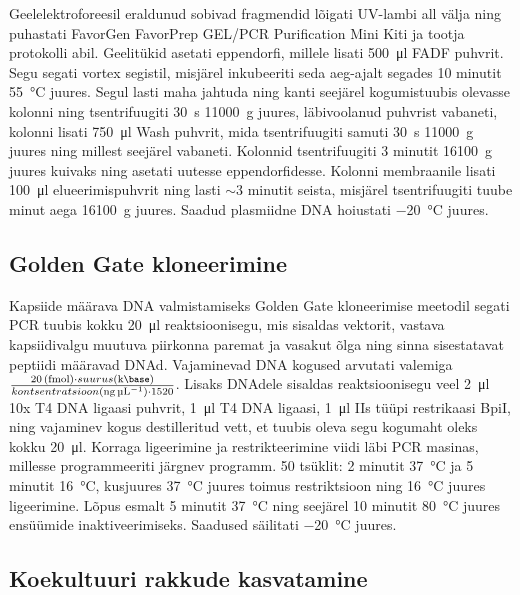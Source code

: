 \documentclass{trkut}%
\begin{document}
Geelelektroforeesil eraldunud sobivad fragmendid lõigati UV-lambi all välja ning puhastati FavorGen FavorPrep GEL/PCR Purification Mini Kiti ja tootja protokolli abil. Geelitükid asetati eppendorfi, millele lisati \SI{500}{\micro\litre} FADF puhvrit. Segu segati vortex segistil, misjärel inkubeeriti seda aeg-ajalt segades 10 minutit \SI{55}{\celsius} juures. Segul lasti maha jahtuda ning kanti seejärel kogumistuubis olevasse kolonni ning tsentrifuugiti \SI{30}{\second} \SI{11000}{\g} juures, läbivoolanud puhvrist vabaneti, kolonni lisati \SI{750}{\micro\litre} Wash puhvrit, mida tsentrifuugiti samuti \SI{30}{\second} \SI{11000}{\g} juures ning millest seejärel vabaneti. Kolonnid tsentrifuugiti 3 minutit \SI{16100}{\g} juures kuivaks ning asetati uutesse eppendorfidesse. Kolonni membraanile lisati \SI{100}{\micro\litre} elueerimispuhvrit ning lasti $\sim$3 minutit seista, misjärel tsentrifuugiti tuube minut aega \SI{16100}{\g} juures. Saadud plasmiidne DNA hoiustati \SI{-20}{\celsius} juures.


\subsection{Golden Gate kloneerimine}

Kapsiide määrava DNA valmistamiseks Golden Gate kloneerimise meetodil segati PCR tuubis kokku \SI{20}{\micro\litre} reaktsioonisegu, mis sisaldas vektorit, vastava kapsiidivalgu muutuva piirkonna paremat ja vasakut õlga ning sinna sisestatavat peptiidi määravad DNAd. Vajaminevad DNA kogused arvutati valemiga $\frac{\SI{20}{(\femto\mole)} \cdot suurus (\si{\kilo\base})}{kontsentratsioon (\si{\nano\gram\per\micro\litre}) \cdot 1520}$. Lisaks DNAdele sisaldas reaktsioonisegu veel \SI{2}{\micro\litre} 10x T4 DNA ligaasi puhvrit, \SI{1}{\micro\litre} T4 DNA ligaasi, \SI{1}{\micro\litre} IIs tüüpi restrikaasi BpiI, ning vajaminev kogus destilleritud vett, et tuubis oleva segu kogumaht oleks kokku \SI{20}{\micro\litre}. Korraga ligeerimine ja restrikteerimine viidi läbi PCR masinas, millesse programmeeriti järgnev programm. 50 tsüklit: 2 minutit \SI{37}{\celsius} ja 5 minutit \SI{16}{\celsius}, kusjuures \SI{37}{\celsius} juures toimus restriktsioon ning \SI{16}{\celsius} juures ligeerimine. Lõpus esmalt 5 minutit \SI{37}{\celsius} ning seejärel 10 minutit \SI{80}{\celsius} juures ensüümide inaktiveerimiseks. Saadused säilitati \SI{-20}{\celsius} juures.

\subsection{Koekultuuri rakkude kasvatamine}
\end{document}

